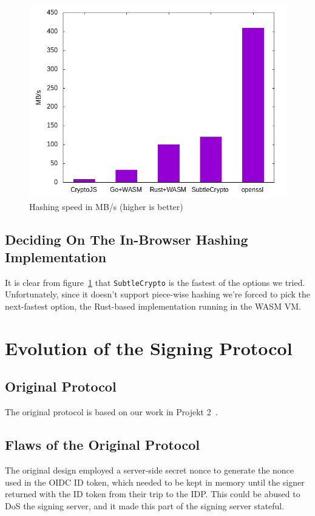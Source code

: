 \begin{figure}
    \begin{center}
        \includegraphics[width=0.7\linewidth]{images/hashingperformance.png}
        \caption{Hashing speed in MB/s (higher is better)}
        \label{fig:hashingperformance}
    \end{center}
\end{figure}


\subsection{Deciding On The In-Browser Hashing Implementation}
\label{subsec:deciding-on-the-in-browser-hashing-implementation}
It is clear from figure~\ref{fig:hashingperformance} that \texttt{SubtleCrypto} is the fastest of the options we tried.
Unfortunately, since it doesn't support piece-wise hashing we're forced to pick the next-fastest option,
the Rust-based implementation running in the \gls{WASM} \gls{VM}.

\section{Evolution of the Signing Protocol}
\label{sec:signingprotocol}

\subsection{Original Protocol}\label{subsec:original-protocol}
The original protocol is based on our work in Projekt 2~\cite{projekt2}.

\subsection{Flaws of the Original Protocol}\label{subsec:flaws-of-the-original-protocol}
The original design employed a server-side secret nonce to generate the nonce used in the \gls{OIDC} ID token,
which needed to be kept in memory until the signer returned with the ID token from their trip to the \gls{IDP}.
This could be abused to \gls{DoS} the signing server,
and it made this part of the signing server stateful.

